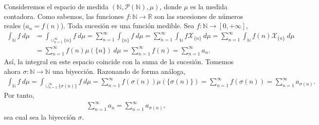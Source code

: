 \begin{ejemplo}
    Consideremos el espacio de medida $(\mathbb{N},\mathcal{P}(\mathbb{N}),\mu)$, donde $\mu$ es la medida contadora. Como sabemos, las funciones $f: \mathbb{N} \longrightarrow \mathbb{R}$ son las sucesiones de números reales ($a_n = f(n)$). Toda sucesión es una función medible. Sea $f : \mathbb{N} \longrightarrow [0,+\infty]$,
    \begin{align*}
        \int_{\mathbb{N}}{f \ d\mu} & = \int_{\cup_{n=1}^{\infty}{\{n\}}}{f \ d\mu} = \sum_{n=1}^{\infty}{\int_{\{n\}}{f \ d\mu}} = \sum_{n=1}^{\infty}{\int_{\mathbb{N}}{f\mathcal{X}_{\{n\}}} \ d\mu} = \sum_{n=1}^{\infty}{\int_{\mathbb{N}}{f(n)\mathcal{X}_{\{n\}} \ d\mu}} \\
                                    & = \sum_{n=1}^{\infty}{f(n)\mu(\{n\}) \ d\mu} = \sum_{n=1}^{\infty}{f(n)} = \sum_{n=1}^{\infty}{a_n}.
    \end{align*}
    Así, la integral en este espacio coincide con la suma de la sucesión. Tomemos  ahora $\sigma: \mathbb{N} \longrightarrow \mathbb{N}$ una biyección. Razonando de forma análoga,
    \begin{align*}
        \int_{\mathbb{N}}{f \ d\mu} = \int_{\cup_{n=1}^{\infty}{\{\sigma(n)\}}}{f \ d\mu} = \sum_{n=1}^{\infty}{f(\sigma(n))\mu(\{\sigma(n)\})} = \sum_{n=1}^{\infty}{f(\sigma(n))} = \sum_{n=1}^{\infty}{a_{\sigma(n)}}.
    \end{align*}
    Por tanto,
    \begin{align*}
        \sum_{n=1}^{\infty}{a_n} = \sum_{n=1}^{\infty}{a_{\sigma(n)}},
    \end{align*}
    sea cual sea la biyección $\sigma$.
\end{ejemplo}

